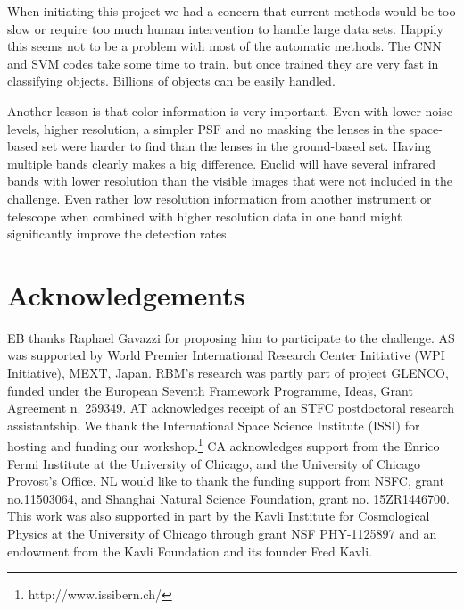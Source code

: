\documentclass[useAMS,usenatbib]{mnras}
\newcommand{\red}[1]{{\color{red} #1}}
\begin{document}
When initiating this project we had a concern that current methods would be too slow or require too much human intervention to handle large data sets.  Happily this seems not to be a problem with most of the automatic methods.  The CNN and SVM codes take some time to train, but once trained they are very fast in classifying objects.  Billions of objects can be easily handled.

Another lesson is that color information is very important.  Even with lower noise levels, higher resolution, a simpler PSF and no masking the lenses in the space-based set were harder to find than the lenses in the ground-based set.  Having multiple bands clearly makes a big difference.  Euclid will have several infrared bands with lower resolution than the visible images that were not included in the challenge.  Even rather low resolution information from another instrument or telescope when combined with higher resolution data in one band might significantly improve the detection rates.


\section*{Acknowledgements}

EB thanks Raphael Gavazzi for proposing him to participate to the challenge.
AS was supported by World Premier International Research Center Initiative (WPI Initiative), MEXT, Japan.
RBM's research was partly part of project GLENCO, funded under the European Seventh Framework Programme, Ideas, Grant Agreement n. 259349.
AT acknowledges receipt of an STFC postdoctoral research
assistantship.
\red{We thank the International Space Science Institute (ISSI) for hosting and funding our workshop.\footnote{http://www.issibern.ch/}}
CA acknowledges support from the Enrico Fermi
Institute at the University of Chicago, and the University of Chicago
Provost's Office. NL would like to thank the funding support from
NSFC, grant no.11503064, and Shanghai Natural Science Foundation,
grant no. 15ZR1446700. This work was also supported in part by the
Kavli Institute for Cosmological Physics at the University of Chicago
through grant NSF PHY-1125897 and an endowment from the Kavli
Foundation and its founder Fred Kavli.






\appendix

\label{lastpage}
\end{document}
